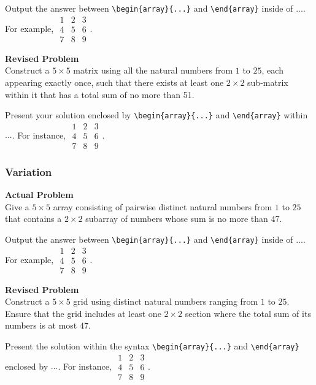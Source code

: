 Output the answer between \verb|\begin{array}{...}| and \verb|\end{array}| inside of $\boxed{...}$. For example, $\boxed{\begin{array}{ccc}1 & 2 & 3 \\ 4 & 5 & 6 \\ 7 & 8 & 9\end{array}}$.

\textbf{Revised Problem}\\
Construct a $5\times 5$ matrix using all the natural numbers from $1$ to $25$, each appearing exactly once, such that there exists at least one $2\times 2$ sub-matrix within it that has a total sum of no more than 51.

Present your solution enclosed by \verb|\begin{array}{...}| and \verb|\end{array}| within $\boxed{...}$. For instance, $\boxed{\begin{array}{ccc}1 & 2 & 3 \\ 4 & 5 & 6 \\ 7 & 8 & 9\end{array}}$.

\subsubsection{Variation}
\textbf{Actual Problem}\\
Give a $5\times 5$ array consisting of pairwise distinct natural numbers from $1$ to $25$ that contains a $2\times 2$ subarray of numbers whose sum is no more than $47$.

Output the answer between \verb|\begin{array}{...}| and \verb|\end{array}| inside of $\boxed{...}$. For example, $\boxed{\begin{array}{ccc}1 & 2 & 3 \\ 4 & 5 & 6 \\ 7 & 8 & 9\end{array}}$.

\textbf{Revised Problem}\\
Construct a $5\times 5$ grid using distinct natural numbers ranging from $1$ to $25$. Ensure that the grid includes at least one $2\times 2$ section where the total sum of its numbers is at most $47$.

Present the solution within the syntax \verb|\begin{array}{...}| and \verb|\end{array}| enclosed by $\boxed{...}$. For instance, $\boxed{\begin{array}{ccc}1 & 2 & 3 \\ 4 & 5 & 6 \\ 7 & 8 & 9\end{array}}$.

